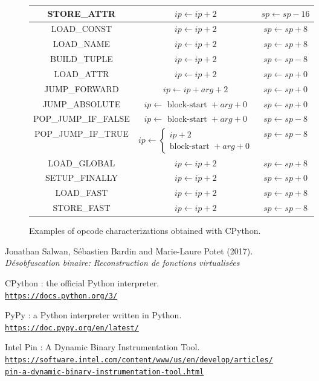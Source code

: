 \documentclass[english]{article}
\begin{document}
\begin{figure}[htp]
\begin{tabular}{|c|c|c|}
		\hline
		STORE\_ATTR & $ip \leftarrow ip + 2$ & $sp \leftarrow sp - 16$\\
		\hline
		LOAD\_CONST & $ip \leftarrow ip + 2$ & $sp \leftarrow sp + 8$\\
		\hline
		LOAD\_NAME & $ip \leftarrow ip + 2$ & $sp \leftarrow sp + 8$\\
		\hline
		BUILD\_TUPLE & $ip \leftarrow ip + 2$ & $sp \leftarrow sp - 8$\\
		\hline
		LOAD\_ATTR & $ip \leftarrow ip + 2$ & $sp \leftarrow sp + 0$\\
		\hline
		JUMP\_FORWARD & $ip \leftarrow ip + arg + 2$ & $sp \leftarrow sp + 0$\\
		\hline
		JUMP\_ABSOLUTE & $ip \leftarrow \textrm{ block-start } + arg + 0$ & $sp \leftarrow sp + 0$\\
		\hline
		POP\_JUMP\_IF\_FALSE & $ip \leftarrow \textrm{ block-start } + arg + 0$ & $sp \leftarrow sp - 8$\\
		\hline
		POP\_JUMP\_IF\_TRUE & 
		$ip \leftarrow 
		\left\{ 
		\begin{array}{ll}
		ip + 2 \\ 
		\textrm{block-start } + arg + 0
		\end{array}
		\right.$ & $sp \leftarrow sp - 8$\\
		\hline
		LOAD\_GLOBAL & $ip \leftarrow ip + 2$ & $sp \leftarrow sp + 8$\\
		\hline
		SETUP\_FINALLY & $ip \leftarrow ip + 2$ & $sp \leftarrow sp + 0$\\
		\hline
		LOAD\_FAST & $ip \leftarrow ip + 2$ & $sp \leftarrow sp + 8$\\
		\hline
		STORE\_FAST & $ip \leftarrow ip + 2$ & $sp \leftarrow sp - 8$\\
		\hline
	\end{tabular}
	\caption{Examples of opcode characterizations obtained with CPython.}
	\label{fig:}
\end{figure}



\begin{thebibliography}{9}
	Jonathan Salwan, Sébastien Bardin and Marie-Laure Potet (2017).
	\\\textit{Désobfuscation binaire: Reconstruction de fonctions virtualisées}
	
	CPython : the official Python interpreter.
	\href{https://docs.python.org/3/}{\\\texttt{https://docs.python.org/3/}}
	
	PyPy : a Python interpreter written in Python.
	\href{https://doc.pypy.org/en/latest/}{\\\texttt{https://doc.pypy.org/en/latest/}}
	
	Intel Pin : A Dynamic Binary Instrumentation Tool.
	\href{https://software.intel.com/content/www/us/en/develop/articles/pin-a-dynamic-binary-instrumentation-tool.html}{\\\texttt{https://software.intel.com/content/www/us/en/develop/articles/\\pin-a-dynamic-binary-instrumentation-tool.html}}
\end{thebibliography}
\end{document}
